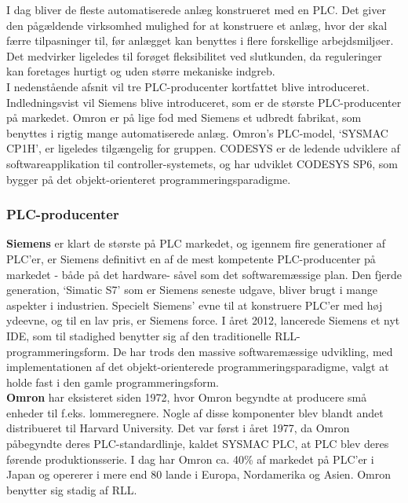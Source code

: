 I dag bliver de fleste automatiserede anlæg konstrueret med en PLC. Det giver den pågældende virksomhed mulighed for at konstruere et anlæg, hvor der skal færre tilpasninger til, før anlægget kan benyttes i flere forskellige arbejdsmiljøer. Det medvirker ligeledes til forøget fleksibilitet ved slutkunden, da reguleringer kan foretages hurtigt og uden større mekaniske indgreb.\\

\noindent I nedenstående afsnit vil tre PLC-producenter kortfattet blive introduceret. Indledningsvist vil Siemens blive introduceret, som er de største PLC-producenter på markedet. Omron er på lige fod med Siemens et udbredt fabrikat, som benyttes i rigtig mange automatiserede anlæg. Omron's PLC-model, \enquote*{SYSMAC CP1H}, er ligeledes tilgængelig for gruppen. CODESYS er de ledende udviklere af softwareapplikation til controller-systemets, og har udviklet CODESYS SP6, som bygger på det objekt-orienteret programmeringsparadigme.

\subsubsection{PLC-producenter}

\noindent\textbf{Siemens} er klart de største på PLC markedet, og igennem fire generationer af PLC'er, er Siemens definitivt en af de mest kompetente PLC-producenter på markedet - både på det hardware- såvel som det softwaremæssige plan. Den fjerde generation, \enquote*{Simatic S7} som er Siemens seneste udgave, bliver brugt i mange aspekter i industrien. Specielt Siemens' evne til at konstruere PLC'er med høj ydeevne, og til en lav pris, er Siemens force. I året 2012, lancerede Siemens et nyt IDE, som til stadighed benytter sig af den traditionelle RLL-programmeringsform. De har trods den massive softwaremæssige udvikling, med implementationen af det objekt-orienterede programmeringsparadigme, valgt at holde fast i den gamle programmeringsform. \\

\noindent\textbf{Omron} har eksisteret siden 1972, hvor Omron begyndte at producere små enheder til f.eks. lommeregnere. Nogle af disse komponenter blev blandt andet distribueret til Harvard University. Det var først i året 1977, da Omron påbegyndte deres PLC-standardlinje, kaldet SYSMAC PLC, at PLC blev deres førende produktionsserie. I dag har Omron ca. 40\% af markedet på PLC'er i Japan og opererer i mere end 80 lande i Europa, Nordamerika og Asien. Omron benytter sig stadig af RLL.\\

